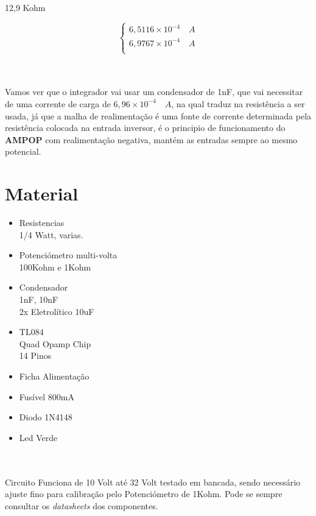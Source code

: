 \documentclass[titlepage, a4paper, 10pt, reqno, openany]{report}
\begin{document}
\hspace{3cm} 12,9 Kohm \hspace{3cm}
\begin{minipage}[l]{0pt}
	$$\left\lbrace\begin{array}{c}
		6,5116 \times 10^{-4} \quad A \\
		6,9767 \times 10^{-4} \quad A \\
	\end{array}\right.$$
\end{minipage}\\
\\
Vamos ver que o integrador vai usar um condensador de 1nF, que vai necessitar de uma corrente de carga de $6,96 \times 10^{-4} \quad A$, na qual traduz na resistência a ser usada, já que a malha de realimentação é uma fonte de corrente determinada pela resistência colocada na entrada inversor, é o principio de funcionamento do {\bf AMPOP} com realimentação negativa, mantém as entradas sempre ao mesmo potencial.

\newpage
\section{Material}
\begin{minipage}[t]{.4\linewidth}
	\begin{itemize}
		\setlength\itemsep{-0.5em}
		\item Resistencias \\
		1/4 Watt, varias.
		\item Potenciómetro multi-volta \\
		100Kohm e 1Kohm
		\item Condensador \\
		1nF, 10nF  \\
		2x Eletrolítico 10uF
		
	\end{itemize}
\end{minipage}
\begin{minipage}[t]{.31\linewidth}
	\begin{itemize}
		\setlength\itemsep{-0.5em}
		\item TL084 \\
		Quad Opamp Chip \\
		14 Pinos
		\item Ficha Alimentação
		\item Fusível 800mA
		\item Diodo 1N4148
		\item Led Verde \\
	\end{itemize}
\end{minipage}\\
\\
Circuito Funciona de 10 Volt até 32 Volt testado em bancada, sendo necessário ajuste fino para calibração pelo Potenciómetro de  1Kohm. 
Pode se sempre consultar os {\it datasheets} dos componentes.\\
\end{document}
